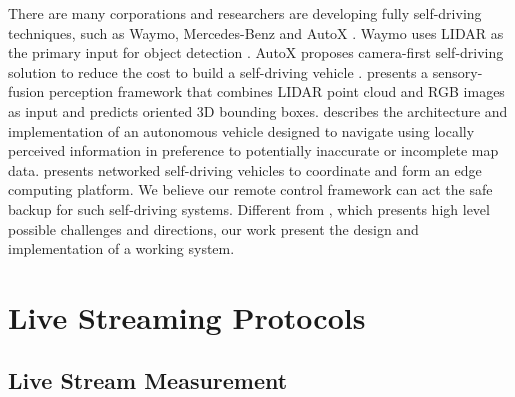 There are many corporations and researchers are developing fully self-driving
techniques, such as Waymo, Mercedes-Benz and AutoX \cite{waymo, benz, autox}.
Waymo uses LIDAR as the primary input for object detection \cite{waymo}. 
AutoX proposes camera-first self-driving solution to reduce
the cost to build a self-driving vehicle \cite{autox}.  
\cite{cvpr17chen} presents a sensory-fusion perception framework 
that combines LIDAR point cloud and RGB images as input and 
predicts oriented 3D bounding boxes. 
\cite{leonard2008perception} describes the architecture and implementation 
of an autonomous vehicle designed to navigate using locally perceived 
information in preference to potentially inaccurate or incomplete map data. 
\cite{lee2016internet} presents networked self-driving vehicles to coordinate 
and form an edge computing platform. 
We believe our remote control framework can act the safe backup
for such self-driving systems.
Different from \cite{kang2018rc}, which presents high level possible 
challenges and directions, 
our work present the design and implementation of a working system.  




\section{Live Streaming Protocols}

\subsection{Live Stream Measurement}

